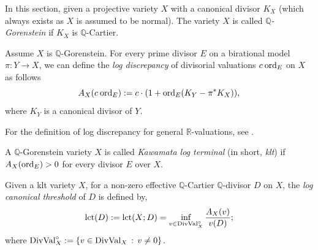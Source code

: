 \newcommand{\cano}{K} %
\newcommand{\DValo}{\DVal^\circ}
\newcommand{\lct}{\mathrm{lct}}

In this section, given a projective variety $X$ with a canonical divisor $\cano_X$ (which always exists as $X$ is assumed to be normal). The variety $X$ is called \emph{$\mathbb{Q}$-Gorenstein} if $\cano_X$ is $\mathbb{Q}$-Cartier.

Assume $X$ is $\mathbb{Q}$-Gorenstein. For every prime divisor $E$ on a birational model $\pi: Y \to X$, we can define the \emph{log discrepancy} of divisorial valuations $c \: \mathrm{ord}_E$ on $X$ as follows
\begin{equation}
	A_X(c \: \ord_E) := c \cdot (1 + \ord_E(\cano_Y - \pi^* \cano_X)) ,
\end{equation}
where $\cano_Y$ is a canonical divisor of $Y$.

\begin{remark}
	For the definition of log discrepancy for general $\mathbb{R}$-valuations, see \cite[\S5]{JM_val_asym_inva_seq_i}.
\end{remark}

A $\mathbb{Q}$-Gorenstein variety $X$ is called \emph{Kawamata log terminal} (in short, \emph{klt}) if $A_X(\mathrm{ord}_E) > 0$ for every divisor $E$ over $X$.

\begin{definition}
	Given a klt variety $X$, for a non-zero effective $\mathbb{Q}$-Cartier $\mathbb{Q}$-divisor $D$ on $X$, the \emph{log canonical threshold} of $D$ is defined by,
	\begin{equation*}
		\lct(D) := \lct(X; D) = \inf_{v \in \DValo_{X}} {A_X(v) \over v(D)} ;
	\end{equation*}
	where $\DValo_{X} : = \{v \in \DVal_X \mid v \neq 0 \}$.
\end{definition}
